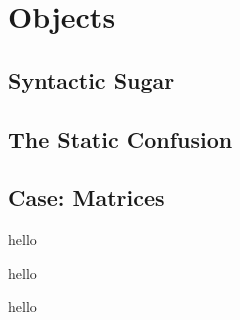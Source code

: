 \chapter{Objects}




\section{Syntactic Sugar}



\section{The Static Confusion}



\section{Case: Matrices}

\csharpsection{\csharp}
hello

hello

hello


